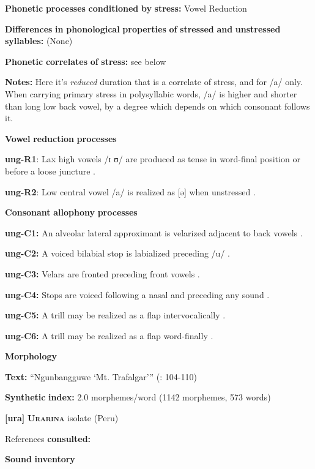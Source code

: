 \textbf{Phonetic} \textbf{processes} \textbf{conditioned} \textbf{by} \textbf{stress:} Vowel Reduction

\textbf{Differences} \textbf{in} \textbf{phonological} \textbf{properties} \textbf{of} \textbf{stressed} \textbf{and} \textbf{unstressed} \textbf{syllables:} (None)

\textbf{Phonetic} \textbf{correlates} \textbf{of} \textbf{stress:} see below

\textbf{Notes:} Here it’s \textit{reduced} duration that is a correlate of stress, and for /a/ only. When carrying primary stress in polysyllabic words, /a/ is higher and shorter than long low back vowel, by a degree which depends on which consonant follows it.

\textbf{Vowel} \textbf{reduction} \textbf{processes}

\textbf{ung-R1}: Lax high vowels /ɪ ʊ/ are produced as tense in word-final position or before a loose juncture \citep[13-16]{Rumsey1978}.

\textbf{ung-R2}: Low central vowel /a/ is realized as [ə] when unstressed \citep[17-18]{Rumsey1978}.

\textbf{Consonant} \textbf{allophony} \textbf{processes}

\textbf{ung-C1:} An alveolar lateral approximant is velarized adjacent to back vowels \citep[11]{Rumsey1978}.

\textbf{ung-C2:} A voiced bilabial stop is labialized preceding /u/ \citep[9-10]{Rumsey1978}.

\textbf{ung-C3:} Velars are fronted preceding front vowels \citep[11]{Rumsey1978}.

\textbf{ung-C4:} Stops are voiced following a nasal and preceding any sound \citep[9]{Rumsey1978}.

\textbf{ung-C5:} A trill may be realized as a flap intervocalically \citep[12]{Rumsey1978}.

\textbf{ung-C6:} A trill may be realized as a flap word-finally \citep[12]{Rumsey1978}.

\textbf{Morphology}

\textbf{Text:} “Ngunbangguwe ‘Mt. Trafalgar’” (\citealt{CoateOates1970}: 104-110)

\textbf{Synthetic} \textbf{index:} 2.0 morphemes/word (1142 morphemes, 573 words)

\textbf{[ura]}   \textbf{\textsc{Urarina}}  isolate (Peru)

References \textbf{consulted:} \citet{Olawsky2006}

\textbf{Sound} \textbf{inventory}

